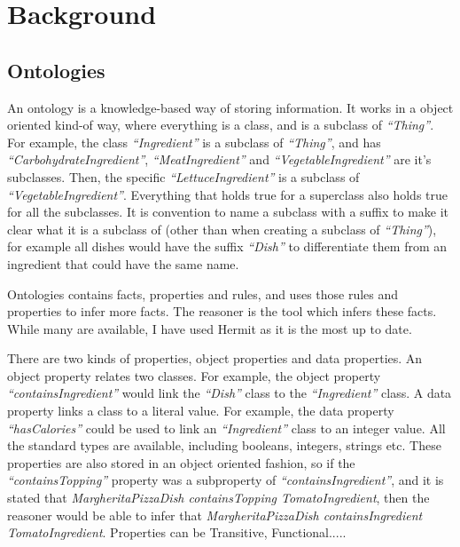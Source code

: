 \chapter{Background}

\section{Ontologies}

An ontology is a knowledge-based way of storing information. It works in a object oriented kind-of way, where everything is a class, and is a subclass of \textit{``Thing''}. For example, the class \textit{``Ingredient''} is a subclass of \textit{``Thing''}, and has \textit{``CarbohydrateIngredient''}, \textit{``MeatIngredient''} and \textit{``VegetableIngredient''} are it's subclasses. Then, the specific \textit{``LettuceIngredient''} is a subclass of \textit{``VegetableIngredient''}. Everything that holds true for a superclass also holds true for all the subclasses. It is convention to name a subclass with a suffix to make it clear what it is a subclass of (other than when creating a subclass of \textit{``Thing''}), for example all dishes would have the suffix \textit{``Dish''} to differentiate them from an ingredient that could have the same name. 

Ontologies contains facts, properties and rules, and uses those rules and properties to infer more facts. The reasoner is the tool which infers these facts. While many are available, I have used Hermit\cite{hermit} as it is the most up to date.

There are two kinds of properties, object properties and data properties. An object property relates two classes. For example, the object property \textit{``containsIngredient''} would link the \textit{``Dish''} class to the \textit{``Ingredient''} class. A data property links a class to a literal value. For example, the data property \textit{``hasCalories''} could be used to link an \textit{``Ingredient''} class to an integer value. All the standard types are available, including booleans, integers, strings etc. These properties are also stored in an object oriented fashion, so if the \textit{``containsTopping''} property was a subproperty of \textit{``containsIngredient''}, and it is stated that \textit{MargheritaPizzaDish containsTopping TomatoIngredient}, then the reasoner would be able to infer that \textit{MargheritaPizzaDish containsIngredient TomatoIngredient}. Properties can be Transitive, Functional.....

